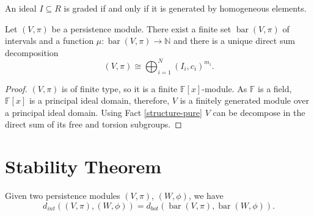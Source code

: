 \begin{proposition}
    An ideal $ I \subseteq R $ is graded if and only if it is generated by homogeneous elements.
\end{proposition}

\begin{theorem}[Structure]
    Let $ (V, \pi) $ be a persistence module. There exist a finite set $ \operatorname{bar}(V, \pi) $ of intervals and a function $ \mu : \operatorname{bar}(V, \pi) \longrightarrow \mathbb N $ and there is a unique direct sum decomposition
    $$
        (V, \pi) \cong \bigoplus_{i=1}^N (I_i, c_i)^{m_i}.
    $$
\end{theorem}
\begin{proof}
    $ (V, \pi) $ is of finite type, so it is a finite $ \mathbb F[x] $-module. As $ \mathbb F $ is a field, $ \mathbb F[x] $ is a principal ideal domain, therefore, $ V $ is a finitely generated module over a principal ideal domain. Using Fact \ref{structure-pure} $ V $ can be decompose in the direct sum of its free and torsion subgroups.
\end{proof}

\newpage
\section{Stability Theorem}
\begin{lemma}
    
\end{lemma}

\begin{theorem}[Stability]
    Given two persistence modules $ (V, \pi) $, $ (W, \phi) $, we have
    $$
        d_{int} ((V, \pi), (W, \phi)) = d_{bot} (\operatorname{bar}(V, \pi), \operatorname{bar}(W, \phi)).
    $$
\end{theorem}
